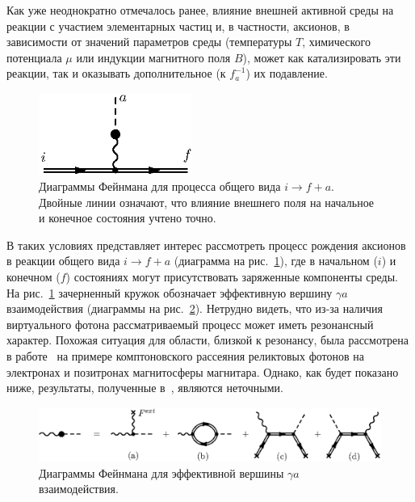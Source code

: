 Как уже неоднократно отмечалось ранее, влияние внешней активной среды на реакции с 
участием элементарных частиц и, в частности,  аксионов,
в зависимости от значений параметров среды (температуры  $T$, 
химического потенциала  $\mu$ или индукции магнитного поля  $B$), может
 как катализировать эти реакции, так и оказывать дополнительное (к $f_a^{-1}$) 
их подавление.  

%
\begin{figure}
\centerline{\includegraphics[width=5cm]{fig5_1.eps}}
\caption{Диаграммы Фейнмана для процесса общего вида $i \to 
f+a$. Двойные линии означают, что влияние внешнего поля на начальное и 
конечное состояния учтено точно.}
\label{fig:Diagaxion}
\end{figure}


В таких условиях представляет интерес рассмотреть процесс рождения аксионов   в 
реакции общего вида $i \to f + a$ (диаграмма на рис.~\ref{fig:Diagaxion}), 
где в начальном ($i$) и конечном ($f$) состояниях могут присутствовать 
заряженные компоненты среды. 
На рис.~\ref{fig:Diagaxion} зачерненный
кружок обозначает эффективную вершину $\gamma a$ взаимодействия
(диаграммы на рис.~\ref{fig:vertexaxion}). Нетрудно видеть, что из-за наличия виртуального 
фотона рассматриваемый процесс может иметь резонансный характер. Похожая ситуация
для области, близкой к резонансу, была рассмотрена в работе~\cite{Skobelev:2007} 
на примере
комптоновского рассеяния реликтовых фотонов на электронах и позитронах магнитосферы
магнитара. Однако, как будет показано ниже,  результаты, полученные 
в~\cite{Skobelev:2007}, являются неточными. 

\begin{figure}
\centerline{\includegraphics[width=15cm]{fig5_2.eps}}
\caption{ Диаграммы Фейнмана для эффективной вершины $\gamma a$ 
взаимодействия.}
\label{fig:vertexaxion}
\end{figure}



